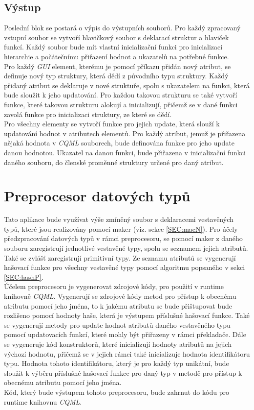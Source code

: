 \documentclass[11pt,twoside,a4paper]{book}
\begin{document}
\subsection{Výstup}
Poslední blok se postará o výpis do výstupních souborů. Pro každý zpracovaný vstupní soubor se vytvoří hlavičkový soubor s deklarací struktur a hlaviček funkcí. Každý soubor bude mít vlastní inicializační funkci pro inicializaci hierarchie a počátečnímu přiřazení hodnot a ukazatelů na potřebné funkce.\\
Pro každý \textit{GUI} element, kterému je pomocí příkazu přidán nový atribut, se definuje nový typ struktury, která dědí z původního typu struktury. Každý přidaný atribut se deklaruje v nové struktuře, spolu s ukazatelem na funkci, která bude sloužit k jeho updatování. Pro každou takovou strukturu se také vytvoří funkce, které takovou strukturu alokují a inicializují, přičemž se v dané funkci zavolá funkce pro inicializaci struktury, ze které se dědí.\\
Pro všechny elementy se vytvoří funkce pro jejich update, která slouží k updatování hodnot v atributech elementů. Pro každý atribut, jemuž je přiřazena nějaká hodnota v \textit{CQML} souborech, bude definována funkce pro jeho update danou hodnotou. Ukazatel na danou funkci, bude přiřazena v inicializační funkci daného souboru, do členské proměnné struktury určené pro daný atribut.\\


\section{\label{SEC:prepN}Preprocesor datových typů}
Tato aplikace bude využívat výše zmíněný soubor s deklaracemi vestavěných typů, které jsou realizovány pomocí maker (viz. sekce \ref{SEC:macN}). Pro účely předzpracování datových typů v rámci preprocesoru, se pomocí maker z daného souboru zaregistrují jednotlivé vestavěné typy, spolu se seznamem jejich atributů. Také se zvlášť zaregistrují primitivní typy. Ze seznamu atributů se vygenerují hašovací funkce pro všechny vestavěné typy pomocí algoritmu popsaného v sekci \ref{SEC:hashP}.\\
Účelem preprocesoru je vygenerovat zdrojové kódy, pro použití v runtime knihovně \textit{CQML}. Vygenerují se zdrojové kódy metod pro přístup k obecnému atributu pomocí jeho jména, to k jakému atributu se bude přištupovat bude rozlišeno pomocí hodnoty haše, která je výstupem příslušné hašovací funkce. Také se vygenerují metody pro update hodnot atributů daného vestavěného typu pomocí updatovacích funkcí, které mohly být přiřazeny v rámci překladače. Dále se vygeneruje kód konstruktorů, které inicializují hodnoty atributů na jejich výchozí hodnotu, přičemž se v jejich rámci také inicializuje hodnota identifikátoru typu. Hodnota tohoto identifikátoru, který je pro každý typ unikátní, bude sloužit k výběru příslušné hašovací funkce pro daný typ v metodě pro přístup k obecnému atributu pomocí jeho jména.\\
Kód, který bude výstupem tohoto preprocesoru, bude zahrnut do kódu pro runtime knihovnu \textit{CQML}.\\
\end{document}
